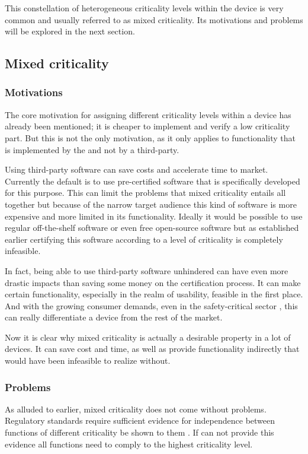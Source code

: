 This constellation of heterogeneous criticality levels within the device is very common and usually referred to as mixed criticality. Its motivations and problems will be explored in the next section.
\subsection{Mixed criticality} \label{mixed-criticality}
\subsubsection{Motivations}
The core motivation for assigning different criticality levels within a device has already been mentioned; it is cheaper to implement and verify a low criticality part. But this is not the only motivation, as it only applies to functionality that is implemented by the \mfg{} and not by a third-party.

Using third-party software can save costs and accelerate time to market. Currently the default is to use pre-certified software that is specifically developed for this purpose. This can limit the problems that mixed criticality entails all together but because of the narrow target audience this kind of software is more expensive and more limited in its functionality. Ideally it would be possible to use regular off-the-shelf software or even free open-source software but as established earlier certifying this software according to a level of criticality is completely infeasible.

In fact, being able to use third-party software unhindered can have even more drastic impacts than saving some money on the certification process. It can make certain functionality, especially in the realm of usability, feasible in the first place. And with the growing consumer demands, even in the safety-critical sector \cite{ITA.May2016}, this can really differentiate a device from the rest of the market.

Now it is clear why mixed criticality is actually a desirable property in a lot of devices. It can save cost and time, as well as provide functionality indirectly that would have been infeasible to realize without.
\subsubsection{Problems}
As alluded to earlier, mixed criticality does not come without problems. Regulatory standards require sufficient evidence for independence between functions of different criticality be shown to them \cite{IEC.2010-1}\cite{IEC.2010-2}. If \mfg{} can not provide this evidence all functions need to comply to the highest criticality level.

